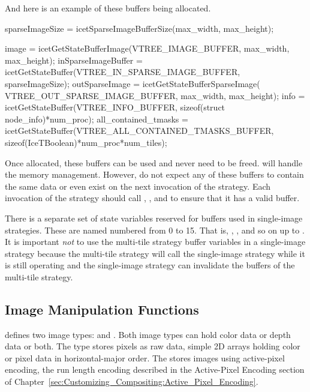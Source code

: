 And here is an example of these buffers being allocated.

\begin{code}
sparseImageSize = icetSparseImageBufferSize(max_width, max_height);

image                = icetGetStateBufferImage(VTREE_IMAGE_BUFFER,
                                               max_width, max_height);
inSparseImageBuffer  = icetGetStateBuffer(VTREE_IN_SPARSE_IMAGE_BUFFER,
                                          sparseImageSize);
outSparseImage       = icetGetStateBufferSparseImage(
                                              VTREE_OUT_SPARSE_IMAGE_BUFFER,
                                              max_width, max_height);
info                 = icetGetStateBuffer(VTREE_INFO_BUFFER,
                                         sizeof(struct node_info)*num_proc);
all_contained_tmasks = icetGetStateBuffer(VTREE_ALL_CONTAINED_TMASKS_BUFFER,
                                    sizeof(IceTBoolean)*num_proc*num_tiles);
\end{code}

Once allocated, these buffers can be used and never need to be freed.
\IceT will handle the memory management.  However, do not expect any of
these buffers to contain the same data or even exist on the next invocation
of the strategy.  Each invocation of the strategy should call
, , and
 to ensure that it has a valid buffer.

There is a separate set of state variables reserved for buffers used in
single-image strategies.  These are named
 numbered from 0 to 15.
That is, ,
, and so on up to
.  It is important \emph{not} to use
the multi-tile strategy buffer variables in a single-image strategy because
the multi-tile strategy will call the single-image strategy while it is
still operating and the single-image strategy can invalidate the buffers of
the multi-tile strategy.

\subsection{Image Manipulation Functions}

\IceT defines two image types:  and
.  Both image types can hold color data or depth
data or both.  The  type stores pixels as raw data, simple
2D arrays holding color or pixel data in horizontal-major order.  The
 stores images using
active-pixel encoding, the run length encoding
described in the Active-Pixel Encoding section of
Chapter~\ref{sec:Customizing_Compositing:Active_Pixel_Encoding}.

